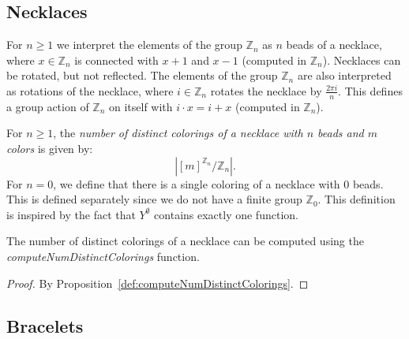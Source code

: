 \subsection{Necklaces}

For $n \geq 1$ we interpret the elements of the group $\mathbb{Z}_n$ as $n$ beads of a necklace, where $x \in \mathbb{Z}_n$ is connected with $x + 1$ and $x - 1$ (computed in $\mathbb{Z}_n$). Necklaces can be rotated, but not reflected. The elements of the group $\mathbb{Z}_n$ are also interpreted as rotations of the necklace, where $i \in \mathbb{Z}_n$ rotates the necklace by $\frac{2\pi i}{n}$. This defines a group action of $\mathbb{Z}_n$ on itself with $i \cdot x = i + x$ (computed in $\mathbb{Z}_n$).

\begin{definition}
  \label{def:numDistinctColoringsOfNecklace}
  \leanok
  For $n \geq 1$, the \emph{number of distinct colorings of a necklace with $n$ beads and $m$ colors} is given by:
  \begin{equation*}
    |[m]^{\mathbb{Z}_n}/\mathbb{Z}_n|.
  \end{equation*}
  For $n = 0$, we define that there is a single coloring of a necklace with $0$ beads. This is defined separately since we do not have a finite group $\mathbb{Z}_0$. This definition is inspired by the fact that $Y^\emptyset$ contains exactly one function.
\end{definition}

\begin{proposition}
  \label{prop:computeNumDistinctColoringsOfNecklace-eq-numDistinctColoringsOfNecklace}
  \leanok
  The number of distinct colorings of a necklace can be computed using the \emph{computeNumDistinctColorings} function.
\end{proposition}

\begin{proof}
  \leanok
  By Proposition~\ref{def:computeNumDistinctColorings}.
\end{proof}

\subsection{Bracelets}

